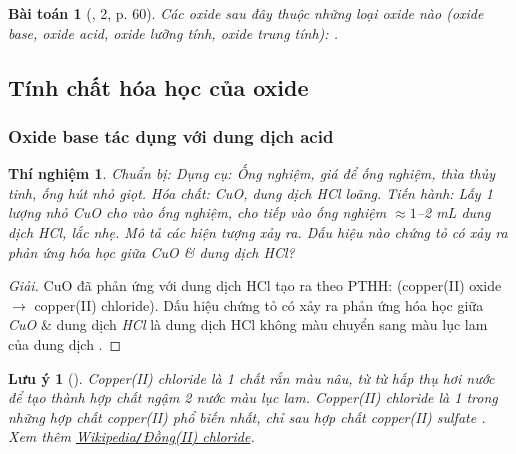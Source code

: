 \documentclass{article}
\newtheorem{baitoan}{Bài toán}
\newtheorem{luuy}{Lưu ý}
\newtheorem{thinghiem}{Thí nghiệm}
\begin{document}
\begin{baitoan}[\cite{SGK_KHTN_8_Canh_Dieu}, 2, p. 60]
	Các oxide sau đây thuộc những loại oxide nào (oxide base, oxide acid, oxide lưỡng tính, oxide trung tính): \emph{}.
\end{baitoan}

\subsection{Tính chất hóa học của oxide}

\subsubsection{Oxide base tác dụng với dung dịch acid}

\begin{thinghiem}
	\emph{Chuẩn bị:} Dụng cụ: Ống nghiệm, giá để ống nghiệm, thìa thủy tinh, ống hút nhỏ giọt. Hóa chất: \emph{CuO}, dung dịch \emph{HCl} loãng. \emph{Tiến hành:} Lấy 1 lượng nhỏ \emph{CuO} cho vào ống nghiệm, cho tiếp vào ống nghiệm $\approx1$\emph{--2 mL} dung dịch \emph{HCl}, lắc nhẹ. Mô tả các hiện tượng xảy ra. Dấu hiệu nào chứng tỏ có xảy ra phản ứng hóa học giữa \emph{CuO} \& dung dịch \emph{HCl}?
\end{thinghiem}

\begin{proof}[Giải]
	CuO đã phản ứng với dung dịch HCl tạo ra  theo PTHH:  (copper(II) oxide $\to$ copper(II) chloride). Dấu hiệu chứng tỏ có xảy ra phản ứng hóa học giữa \emph{CuO} \& dung dịch \emph{HCl} là dung dịch HCl không màu chuyển sang màu lục lam của dung dịch .
\end{proof}

\begin{luuy}[]
	Copper(II) chloride \emph{} là 1 chất rắn màu nâu, từ từ hấp thụ hơi nước để tạo thành hợp chất ngậm 2 nước màu lục lam. Copper(II) chloride là 1 trong những hợp chất copper(II) phổ biến nhất, chỉ sau hợp chất copper(II) sulfate \emph{}. Xem thêm \href{https://vi.wikipedia.org/wiki/%C4%90%E1%BB%93ng(II)_chloride}{Wikipedia\emph{\texttt{/}}Đồng(II) chloride}.
\end{luuy}
\end{document}
